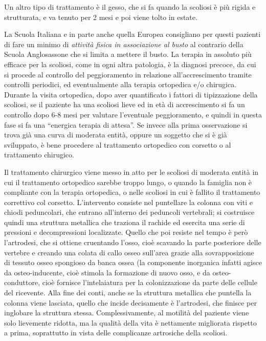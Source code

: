 Un altro tipo di trattamento è il gesso, che si fa quando la scoliosi è
più rigida e strutturata, e va tenuto per 2 mesi e poi viene tolto in
estate.

La Scuola Italiana e in parte anche quella Europea consigliano per
questi pazienti di fare un minimo di \emph{attività fisica in
associazione al busto} al contrario della Scuola Anglosassone che si
limita a mettere il busto. La terapia in assoluto più efficace per la
scoliosi, come in ogni altra patologia, è la diagnosi precoce, da cui si
procede al controllo del peggioramento in relazione all'accrescimento
tramite controlli periodici, ed eventualmente alla terapia ortopedica
e/o chirugica. Durante la visita ortopedica, dopo aver quantificato i
fattori di tipizzazione della scoliosi, se il paziente ha una scoliosi
lieve ed in età di accrescimento si fa un controllo dopo 6-8 mesi per
valutare l'eventuale peggioramento, e quindi in questa fase si fa una
``energica terapia di attesa''. Se invece alla prima osservazione si
trova già una curva di moderata entità, oppure un soggetto che si è già
sviluppato, è bene procedere al trattamento ortopedico con corsetto o al
trattamento chirugico.

Il trattamento chirurgico viene messo in atto per le scoliosi di
moderata entità in cui il trattamento ortopedico sarebbe troppo lungo, o
quando la famiglia non è compliante con la terapia ortopedica, o nelle
scoliosi in cui è fallito il trattamento correttivo col corsetto.
L'intervento consiste nel puntellare la colonna con viti e chiodi
peduncolari, che entrano all'interno dei peduncoli vertebrali; si
costruisce quindi una struttura metallica che traziona il rachide ed
esercita una serie di pressioni e decompressioni localizzate. Quello che
poi resiste nel tempo è però l'artrodesi, che si ottiene cruentando
l'osso, cioè scavando la parte posteriore delle vertebre e creando una
colata di callo osseo sull'area grazie alla sovrapposizione di tessuto
osseo spongioso da banca ossea (la componente inorganica infatti agisce
da osteo-inducente, cioè stimola la formazione di nuovo osso, e da
osteo-conduttore, cioè fornisce l'intelaiatura per la colonizzazione da
parte delle cellule del ricevente. Alla fine dei conti, anche se la
struttura metallica che puntella la colonna viene lasciata, quello che
incide decisamente è l'artrodesi, che finisce per inglobare la struttura
stessa. Complessivamente, al motilità del paziente viene solo lievemente
ridotta, ma la qualità della vita è nettamente migliorata rispetto a
prima, soprattutto in vista delle complicanze artrosiche della scoliosi.

